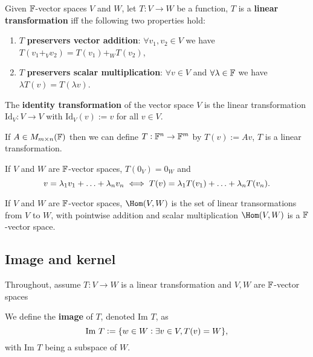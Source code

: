 \documentclass[../Year1.tex]{subfiles}
\begin{document}
\begin{definition}
    Given $\mathbb{F}$-vector spaces $V$ and $W$, let $T:V \rightarrow W$ be a function, $T$ is a \textbf{linear transformation} iff the following two properties hold: \begin{enumerate}
        \item $T$ \textbf{preservers vector addition}: $\forall v_1,v_2\in V$ we have $T(v_1 +_V v_2) = T(v_1) +_W T(v_2)$,
        \item $T$ \textbf{preservers scalar multiplication}: $\forall v\in V$ and  $\forall \lambda \in \mathbb{F}$ we have $\lambda T(v) = T(\lambda v)$.
    \end{enumerate} 
\end{definition}

\begin{definition}
    The \textbf{identity transformation} of the vector space $V$ is the linear transformation $\text{Id}_V: V\rightarrow V$ with $\text{Id}_V(v):=v$ for all $v\in V$.
\end{definition}

\begin{definition}
    If $A\in M_{m\times n}(\mathbb{F})$ then we can define $T:\mathbb{F}^n \rightarrow \mathbb{F}^m$ by $T(v):=Av$, $T$ is a linear transformation.
\end{definition}

\begin{theorem}
    If $V$ and $W$ are $\mathbb{F}$-vector spaces, $T(0_V) = 0_W$ and \[
        v = \lambda_1v_1 + \ldots + \lambda_nv_n \iff T(v) = \lambda_1T(v_1) + \ldots + \lambda_nT(v_n)
        \textcolor{black}{.}
    \]
\end{theorem}

\begin{theorem}
    If $V$ and $W$ are $\mathbb{F}$-vector spaces, $\Hom(V,W)$ is the set of linear transormations from $V$ to $W$, with pointwise addition and scalar multiplication $\Hom(V,W)$ is a $\mathbb{F}$-vector space.
\end{theorem}

\subsection{Image and kernel}
Throughout, assume $T:V\rightarrow W$ is a linear transformation and $V,W$ are $\mathbb{F}$-vector spaces
\begin{definition}[Image]
    We define the \textbf{image} of $T$, denoted $\text{Im }T$, as \[
        \text{Im }T := \{w\in W: \exists v\in V, T(v)=W\}
        \textcolor{black}{,}
    \]
    with $\text{Im }T$ being a subspace of $W$.
\end{definition}
\end{document}
